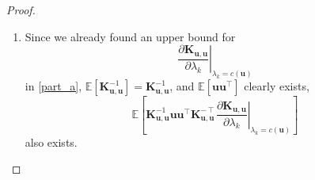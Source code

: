 \documentclass{article}
\theoremstyle{definition}
\newcommand{\Kuu}{\mathbf{K}_{\mathbf{u},\mathbf{u}}}
\begin{document}
\begin{proof}
\begin{enumerate}
\begin{enumerate}
      If $k > 0$, then each element of $\frac{\partial \Kuu}{\partial
        \lambda_k}$ is a constant multiple of $k_{\bm\lambda}(\mathbf{x}_l,
      \mathbf{x}_m)$ for some $\mathbf{x}_l$ and $\mathbf{x}_m$. Since
      $k_{\bm\lambda}(\mathbf{x}_l, \mathbf{x}_m)$ is a decreasing function of
      $\lambda_k$, and $c(\mathbf{u}) > \lambda_k - \epsilon$,
      \[
        \begin{split}
          k_{\bm\lambda}(\mathbf{x}_l, \mathbf{x}_m)|_{\lambda_k = 
            c(\mathbf{u})} &=
          \begin{multlined}[t]
            \lambda_0 \exp \left( \vphantom{\sum_{n \in \{ \} \setminus}}
            \right. -\frac{1}{2}c(\mathbf{u})(x_{l,k} - x_{m,k})^2 -
            \mathbbm{1}[l \ne m]\sigma^2c(\mathbf{u}) \\
            - \left. \sum_{n \in \{ 1, \dots, d \} \setminus \{ k \}}
              \frac{1}{2} \lambda_n(x_{l,n} - x_{m,n})^2 + \mathbbm{1}[l \ne
              m]\sigma^2 \lambda_n \right)
          \end{multlined} \\
          &<
          \begin{multlined}[t]
            \lambda_0 \exp \left( \vphantom{\sum_{n \in \{ \} \setminus}}
            \right. -\frac{1}{2}(\lambda_k - \epsilon)(x_{l,k} - x_{m,k})^2 -
            \mathbbm{1}[l \ne m]\sigma^2(\lambda_k - \epsilon) \\
            - \left. \sum_{n \in \{ 1, \dots, d \} \setminus \{ k \}}
              \frac{1}{2} \lambda_n(x_{l,n} - x_{m,n})^2 + \mathbbm{1}[l \ne
              m]\sigma^2 \lambda_n \right),
          \end{multlined}
        \end{split}
      \]
      which gives an upper bound on each element of
      \[
        \left. \frac{\partial \Kuu}{\partial \lambda_k} \right|_{\lambda_k =
          c(\mathbf{u})}.
      \]
      and shows the existence of
      \[
        \mathbb{E} \left[ \left. \frac{\partial \Kuu}{\partial \lambda_k}
          \right|_{\lambda_k = c(\mathbf{u})} \right].
      \]
    \item Since we already found an upper bound for
      \[
        \left. \frac{\partial \Kuu}{\partial \lambda_k} \right|_{\lambda_k =
          c(\mathbf{u})}
      \]
      in \ref{part_a}, $\mathbb{E}[\Kuu^{-1}] = \Kuu^{-1}$, and
      $\mathbb{E}[\mathbf{u}\mathbf{u}^\intercal]$ clearly exists,
      \[
        \mathbb{E} \left[
          \Kuu^{-1}\mathbf{u}\mathbf{u}^\intercal\Kuu^{-\intercal} \left.
            \frac{\partial \Kuu}{\partial \lambda_k} \right|_{\lambda_k =
            c(\mathbf{u})} \right]
      \]
      also exists.
    \end{enumerate}
  \end{enumerate}
\end{proof}
\end{document}
